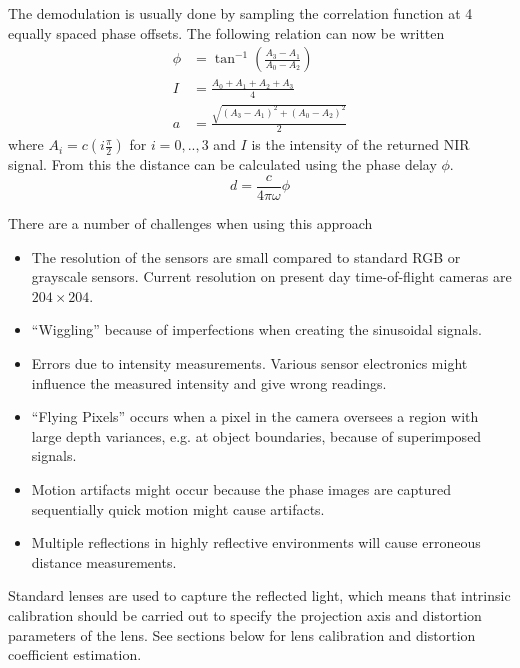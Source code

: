 The demodulation is usually done by sampling the correlation function at 4 equally spaced
phase offsets. The following relation can now be written
\begin{equation}
    \begin{aligned}
        \phi &= \tan^{-1} (\frac{A_3 - A_1}{A_0 - A_2}) \\
        I &= \frac{A_0 + A_1 + A_2 + A_3}{4} \\
        a &= \frac{\sqrt{(A_3 - A_1)^2 + (A_0 - A_2)^2}}{2}
    \end{aligned}
\end{equation}
where $A_i = c(i \frac{\pi}{2})$ for $ i = 0,..,3$ and $I$ is the intensity of the returned NIR
signal. From this the distance can be calculated using the phase delay $\phi$. 
\begin{equation}
    d = \frac{c}{4 \pi \omega} \phi
\end{equation}

There are a number of challenges when using this approach
\cite{time-of-flight-comp-graphics}
\begin{itemize}
    \item The resolution of the sensors are small compared to standard RGB or grayscale
        sensors. Current resolution on present day time-of-flight cameras are $204 \times
        204$. 
    \item ``Wiggling'' because of imperfections when creating the sinusoidal signals.
    \item Errors due to intensity measurements. Various sensor electronics might influence
        the measured intensity and give wrong readings.
    \item ``Flying Pixels'' occurs when a pixel in the camera oversees a region with
        large depth variances, e.g. at object boundaries, because of superimposed signals. 
    \item Motion artifacts might occur because the phase images are captured sequentially
        quick motion might cause artifacts.
    \item Multiple reflections in highly reflective environments will cause erroneous
        distance measurements.
\end{itemize}

Standard lenses are used to capture the reflected light, which means that intrinsic
calibration should be carried out to specify the projection axis and distortion parameters
of the lens. See sections below for lens calibration and distortion coefficient
estimation. \cite{time-of-flight-comp-graphics}


